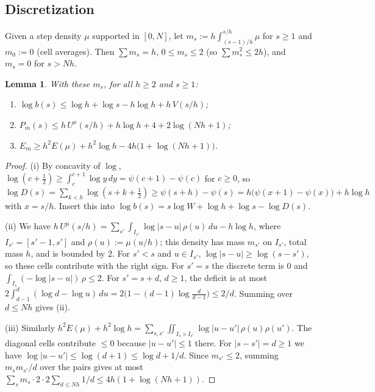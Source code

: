 \documentclass[11pt]{amsart}
\newtheorem{lemma}[theorem]{Lemma}
\theoremstyle{definition}
\theoremstyle{remark}
\numberwithin{equation}{section}
\begin{document}
\subsection{Discretization}
Given a step density $\mu$ supported in $[0,N]$, let $m_s:=h\int_{(s-1)/h}^{s/h}\mu$ for $s\ge1$ and $m_0:=0$ (cell
averages). Then $\sum m_s=h$, $0\le m_s\le2$ (so $\sum m_s^2\le2h$), and $m_s=0$ for $s>Nh$.

\begin{lemma}\label{lem:discrete}
With these $m_s$, for all $h\ge2$ and $s\ge1$:
\begin{enumerate}
\item $\log b(s)\le\log h+\log s-h\log h+h\,V(s/h)$;
\item $P_m(s)\le h\,U^\mu(s/h)+h\log h+4+2\log(Nh+1)$;
\item $E_m\ge h^2E(\mu)+h^2\log h-4h\bigl(1+\log(Nh+1)\bigr)$.
\end{enumerate}
\end{lemma}

\begin{proof}
(i) By concavity of $\log$, $\log(c+\frac12)\ge\int_c^{c+1}\log y\,dy=\psi(c+1)-\psi(c)$ for $c\ge0$, so
$\log D(s)=\sum_{k<h}\log(s+k+\frac12)\ge\psi(s+h)-\psi(s)=h\bigl(\psi(x+1)-\psi(x)\bigr)+h\log h$ with $x=s/h$. Insert this into
$\log b(s)=s\log W+\log h+\log s-\log D(s)$.

(ii) We have $h\,U^\mu(s/h)=\sum_{s'}\int_{I_{s'}}\log|s-u|\,\rho(u)\,du-h\log h$, where $I_{s'}=[s'-1,s']$ and
$\rho(u):=\mu(u/h)$; this density has mass $m_{s'}$ on $I_{s'}$, total mass $h$, and is bounded by $2$. For
$s'<s$ and $u\in I_{s'}$, $\log|s-u|\ge\log(s-s')$, so these cells contribute with the right sign. For $s'=s$ the
discrete term is $0$ and $\int_{I_s}(-\log|s-u|)\,\rho\le2$. For $s'=s+d$, $d\ge1$, the deficit is at most
$2\int_{d-1}^{d}(\log d-\log u)\,du=2\bigl(1-(d-1)\log\tfrac d{d-1}\bigr)\le2/d$. Summing over $d\le Nh$ gives (ii).

(iii) Similarly $h^2E(\mu)+h^2\log h=\sum_{s,s'}\iint_{I_s\times I_{s'}}\log|u-u'|\,\rho(u)\rho(u')$. The diagonal cells
contribute $\le0$ because $|u-u'|\le1$ there. For $|s-s'|=d\ge1$ we have $\log|u-u'|\le\log(d+1)\le\log d+1/d$. Since $m_{s'}\le2$, summing
$m_sm_{s'}/d$ over the pairs gives at most $\sum_sm_s\cdot2\cdot2\sum_{d\le Nh}1/d\le4h(1+\log(Nh+1))$.
\end{proof}
\end{document}
